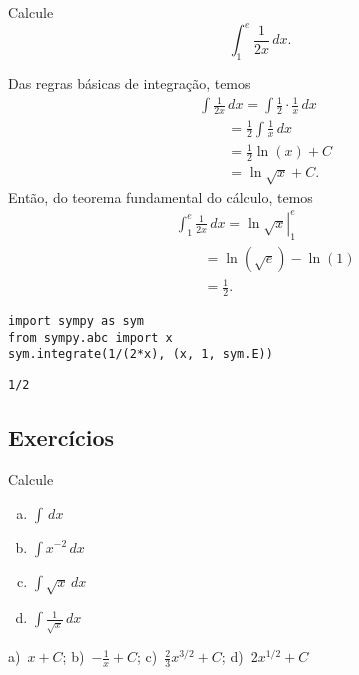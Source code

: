 \begin{exeresol}
  Calcule
  \begin{equation}
    \int_1^{e} \frac{1}{2x}\,dx.
  \end{equation}
\end{exeresol}
\begin{resol}
  Das regras básicas de integração, temos
  \begin{align}
    & \int \frac{1}{2x}\,dx = \int \frac{1}{2}\cdot\frac{1}{x}\,dx \\
    &\text{}\qquad = \frac{1}{2}\int\frac{1}{x}\,dx \\
    &\text{}\qquad = \frac{1}{2}\ln(x) + C \\
    &\text{}\qquad = \ln\sqrt{x} + C.
  \end{align}
  Então, do teorema fundamental do cálculo, temos
  \begin{align}
    & \int_1^e \frac{1}{2x}\,dx = \left.\ln\sqrt{x}\right|_1^e\\
    &\text{}\qquad = \ln(\sqrt{e}) - \ln(1)\\
    &\text{}\qquad = \frac{1}{2}.
  \end{align}

\begin{lstlisting}
import sympy as sym
from sympy.abc import x
sym.integrate(1/(2*x), (x, 1, sym.E))
\end{lstlisting}

\begin{verbatim}
1/2
\end{verbatim}

\end{resol}


\subsection{Exercícios}

\begin{exer}
  Calcule
  \begin{enumerate}[a)]
  \item $\displaystyle \int \,dx$
  \item $\displaystyle \int x^{-2}\,dx$
  \item $\displaystyle \int \sqrt{x}\,dx$
  \item $\displaystyle \int \frac{1}{\sqrt{x}}\,dx$
  \end{enumerate}
\end{exer}
\begin{resp}
  a)~$\displaystyle x + C$; b)~$\displaystyle -\frac{1}{x} + C$; c)~$\displaystyle \frac{2}{3}x^{3/2} + C$; d)~$\displaystyle 2x^{1/2} + C$
\end{resp}

